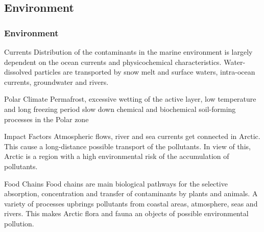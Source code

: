 \documentclass[pdflatex,compress,8pt,
	xcolor={dvipsnames,dvipsnames,svgnames,x11names,table},
	hyperref={	
	breaklinks = true, 
	pdfauthor={Lemenkova Polina}, 
	pdfsubject={Presentation}, 
	pdfcreator={Lemenkova Polina}, 
	pdfproducer={Lemenkova Polina}, 
	colorlinks=true,
	linkcolor=NavyBlue, 
	citecolor=NavyBlue, 
	urlcolor = NavyBlue, 
	breaklinks = true}]{beamer}
\begin{document}
\subsection{Environment}
\begin{frame}\frametitle{Environment}

\begin{alertblock}{Currents}
Distribution of the contaminants in the marine environment is largely dependent on the ocean currents and physicochemical characteristics. Water-dissolved particles are transported by snow melt and surface waters, intra-ocean currents, groundwater and rivers.
\end{alertblock}

\begin{block}{Polar Climate}
Permafrost, excessive wetting of the active layer, low temperature and long freezing period slow down chemical and biochemical soil-forming processes in the Polar zone
\end{block}

\begin{alertblock}{Impact Factors}
Atmospheric flows, river and sea currents get connected in Arctic. This cause a long-distance possible transport of the pollutants. In view of this, Arctic is a region with a high environmental risk of the accumulation of pollutants.
\end{alertblock}

\begin{block}{Food Chains}
Food chains are main biological pathways for the selective absorption, concentration and transfer of contaminants by plants and animals. A variety of processes upbrings pollutants from coastal areas, atmosphere, seas and rivers. This makes Arctic flora and fauna an objects of possible environmental pollution.
\end{block}

\end{frame}
\end{document}
